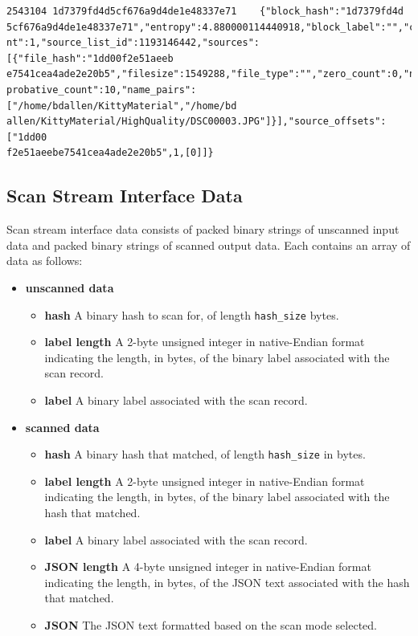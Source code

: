\documentclass[11pt,fleqn]{article} %
\begin{document}
\lstset{style=customfile}
\begin{lstlisting}[float, caption={Example output from a scan match}, label=ScanDataWithPath]
2543104	1d7379fd4d5cf676a9d4de1e48337e71	{"block_hash":"1d7379fd4d
5cf676a9d4de1e48337e71","entropy":4.880000114440918,"block_label":"","cou
nt":1,"source_list_id":1193146442,"sources":[{"file_hash":"1dd00f2e51aeeb
e7541cea4ade2e20b5","filesize":1549288,"file_type":"","zero_count":0,"non
probative_count":10,"name_pairs":["/home/bdallen/KittyMaterial","/home/bd
allen/KittyMaterial/HighQuality/DSC00003.JPG"]}],"source_offsets":["1dd00
f2e51aeebe7541cea4ade2e20b5",1,[0]]}
\end{lstlisting}

\subsection{Scan Stream Interface Data}
Scan stream interface data consists of packed binary strings of unscanned input data and packed binary strings of scanned output data. Each contains an array of data as follows:\\
\begin{itemize}
\item \textbf{unscanned data}
  \begin{itemize}
  \item \textbf{hash} A binary hash to scan for, of length \verb+hash_size+ bytes.
  \item \textbf{label length} A 2-byte unsigned integer in native-Endian format indicating the length, in bytes, of the binary label associated with the scan record.
  \item \textbf{label} A binary label associated with the scan record.
  \end{itemize}
\item \textbf{scanned data}
  \begin{itemize}
  \item \textbf{hash} A binary hash that matched, of length \verb+hash_size+ in bytes.
  \item \textbf{label length} A 2-byte unsigned integer in native-Endian format indicating the length, in bytes, of the binary label associated with the hash that matched.
  \item \textbf{label} A binary label associated with the scan record.
  \item \textbf{JSON length} A 4-byte unsigned integer in native-Endian format indicating the length, in bytes, of the JSON text associated with the hash that matched.
  \item \textbf{JSON} The JSON text formatted based on the scan mode selected.
  \end{itemize}
\end{itemize}
\end{document}
